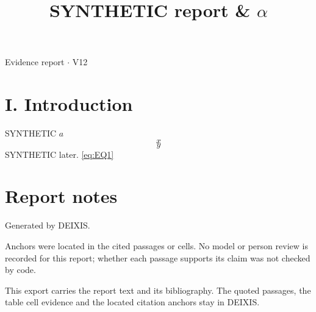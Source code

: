 \documentclass[journal]{IEEEtran}
\begin{document}
\title{SYNTHETIC report \& \ensuremath{\alpha}}

\maketitle

\noindent Evidence report \ensuremath{\cdot} V12

\section*{I. Introduction}

SYNTHETIC $a$
\begin{equation}
\label{eq:EQ1}
x
\end{equation}
\begin{equation*}
y
\end{equation*}
\cite{Synth26} SYNTHETIC later. \eqref{eq:EQ1} \cite{Synth26}

\section*{Report notes}

Generated by DEIXIS.

Anchors were located in the cited passages or cells. No model or person review is recorded for this report; whether each passage supports its claim was not checked by code.

This export carries the report text and its bibliography. The quoted passages, the table cell evidence and the located citation anchors stay in DEIXIS.




\end{document}
